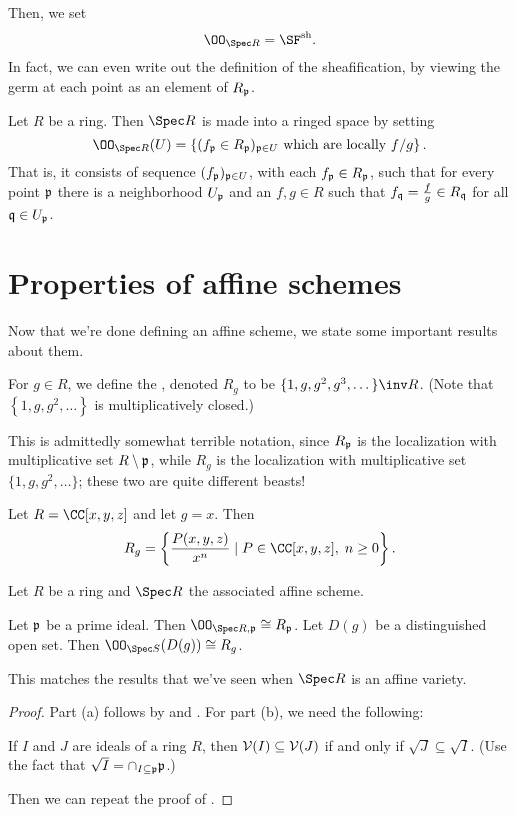 \documentclass[11pt]{scrreprt}
\begin{document}
Then, we set \[ \OO_{\Spec R} = \SF\sh. \]
In fact, we can even write out the definition of the sheafification,
by viewing the germ at each point as an element of $R_\mathfrak p$.
\begin{definition}
	Let $R$ be a ring. Then $\Spec R$ is made into a ringed space by setting
	\[ \OO_{\Spec R}(U) 
		= \left\{ (f_\pp \in R_\pp)_{\pp \in U}
		\text{ which are locally $f/g$} \right\}. \]
	That is, it consists of sequence $(f_\mathfrak p)_{\mathfrak p \in U}$, with
	each $f_\mathfrak p \in R_\mathfrak p$, such that for every point $\mathfrak p$ there
	is a neighborhood $U_\mathfrak p$ and an $f,g \in R$ such that
	$f_\mathfrak q = \frac fg \in R_\mathfrak q$ for all $\mathfrak q \in U_\mathfrak p$.
\end{definition}

\section{Properties of affine schemes}
Now that we're done defining an affine scheme,
we state some important results about them.

\begin{definition}
	For $g \in R$, we define the ,
	denoted $R_g$ to be $\{1, g, g^2, g^3, \dots\}\inv R$.
	(Note that $\left\{ 1, g, g^2, \dots \right\}$ is multiplicatively closed.)
\end{definition}
This is admittedly somewhat terrible notation, since $R_\mathfrak p$
is the localization with multiplicative set $R \setminus \mathfrak p$,
while $R_g$ is the localization with multiplicative set $\{1,g,g^2,\dots\}$;
these two are quite different beasts!

\begin{example}
	Let $R = \CC[x,y,z]$ and let $g = x$.
	Then
	\[ R_g = \left\{ \frac{P(x,y,z)}{x^n} \mid
		P \in \CC[x,y,z], \; n \ge 0 \right\}. \]
\end{example}
\begin{theorem}
	Let $R$ be a ring and $\Spec R$ the associated affine scheme.
	\begin{enumerate}[(a)]
		\ii Let $\mathfrak p$ be a prime ideal.
		Then $\OO_{\Spec R, \pp} \cong R_\pp$.
		\ii Let $D(g)$ be a distinguished open set.
		Then $\OO_{\Spec S}(D(g)) \cong R_g$.
	\end{enumerate}
	\label{thm:affine_struct_master}
\end{theorem}
This matches the results that we've seen when $\Spec R$ is an affine variety.
\begin{proof}
	Part (a) follows by 
	and .
	For part (b), we need the following:
	\begin{ques}
		If $I$ and $J$ are ideals of a ring $R$,
		then $\mathcal V(I) \subseteq \mathcal V(J)$ if and only if
		$\sqrt{J} \subseteq \sqrt{I}$.
		(Use the fact that $\sqrt I = \cap_{I \subseteq \mathfrak p} \mathfrak p$.)
	\end{ques}
	Then we can repeat the proof of .
\end{proof}
\end{document}
